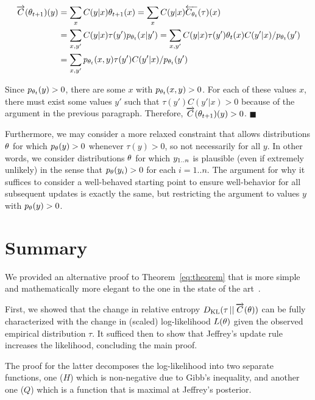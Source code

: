 \documentclass{article}
\begin{document}
\begin{align}
    \Cfwd(\pxtt)(y) &= \sum_x C(y|x) \pxtt(x)
    = \sum_x C(y|x) \Cbwd[\pxt](\tau)(x)
    \notag\\
    &= \sum_{x,y'} C(y|x) \tau(y') \ppxt(x|y')
    = \sum_{x,y'} C(y|x) \tau(y') \pxt(x) C(y'|x) / \ppxt(y')
    \notag\\
    &= \sum_{x,y'} \ppxt(x,y) \tau(y')  C(y'|x) / \ppxt(y')
\end{align}

Since ${p_{{{\theta}_t}}}(y)>0$, there are some $x$ with ${p_{{{\theta}_t}}}(x,y)>0$.
For each of these values $x$, there must exist some values $y'$ such that $\tau(y')C(y'|x)>0$ because of the argument in the previous paragraph.
Therefore, $\overrightarrow{C}({{\theta}_{t+1}})(y)>0$.
\hfill$\blacksquare$

Furthermore, we may consider a more relaxed constraint that allows distributions ${\theta}$ for which ${p_{\theta}}(y)>0$ whenever $\tau(y)>0$, so not necessarily for all $y$.
In other words, we consider distributions ${\theta}$ for which ${y_{1..n}}$ is plausible (even if extremely unlikely) in the sense that ${p_{\theta}}(y_i)>0$ for each $i=1..n$.
The argument for why it suffices to consider a well-behaved starting point to ensure well-behavior for all subsequent updates is exactly the same, but restricting the argument to values $y$ with ${p_{\theta}}(y)>0$.


\section{Summary}

We provided an alternative proof to Theorem~\ref{eq:theorem} that is more simple and mathematically more elegant to the one in the state of the art~\cite{jacobs2021learning}.

First, we showed that the change in relative entropy $\DKL[\tau][\Cfwd(\px)]$ can be fully characterized with the change in (scaled) log-likelihood $L({\theta})$ given the observed empirical distribution $\tau$.
It sufficed then to show that Jeffrey's update rule increases the likelihood, concluding the main proof.

The proof for the latter decomposes the log-likelihood into two separate functions, one ($H$) which is non-negative due to Gibb's inequality, and another one ($Q$) which is a function that is maximal at Jeffrey's posterior.



\end{document}
